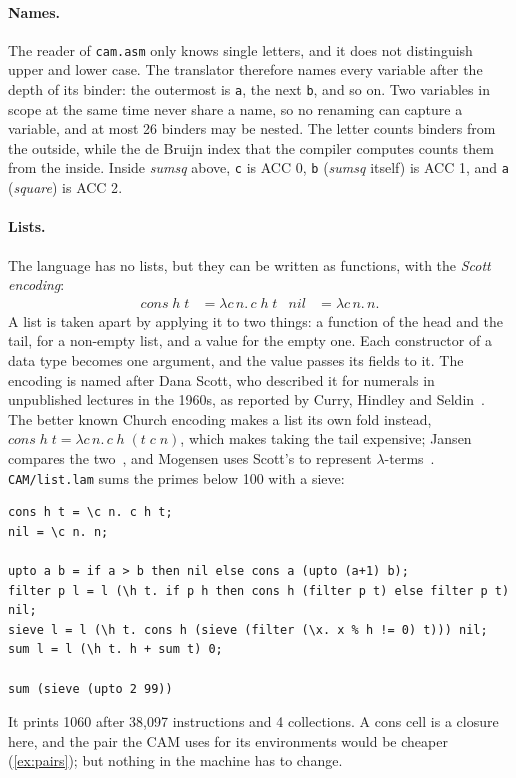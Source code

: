 \documentclass[11pt,a4paper]{article}
\newcommand{\ins}[1]{\textsf{#1}}
\theoremstyle{definition}
\theoremstyle{plain}
\begin{document}
\paragraph{Names.} The reader of \texttt{cam.asm} only knows single
letters, and it does not distinguish upper and lower case. The translator
therefore names every variable after the depth of its binder: the outermost
is \texttt{a}, the next \texttt{b}, and so on. Two variables in scope at the
same time never share a name, so no renaming can capture a variable, and at
most 26 binders may be nested. The letter counts binders from the outside,
while the de Bruijn index that the compiler computes counts them from the
inside. Inside \textit{sumsq} above, \texttt{c} is \ins{ACC 0}, \texttt{b}
(\textit{sumsq} itself) is \ins{ACC 1}, and \texttt{a} (\textit{square}) is
\ins{ACC 2}.

\paragraph{Lists.} The language has no lists, but they can be written as
functions, with the \emph{Scott encoding}:
\begin{align*}
  \mathit{cons}\;h\;t &= \lambda c\,n.\,c\;h\;t &
  \mathit{nil} &= \lambda c\,n.\,n.
\end{align*}
A list is taken apart by applying it to two things: a function of the head
and the tail, for a non-empty list, and a value for the empty one. Each
constructor of a data type becomes one argument, and the value passes its
fields to it. The encoding is named after Dana Scott, who described it for
numerals in unpublished lectures in the 1960s, as reported by Curry, Hindley
and Seldin~\cite{chs72}. The better known Church encoding makes a list its
own fold instead, $\mathit{cons}\;h\;t = \lambda c\,n.\,c\;h\;(t\;c\;n)$, which
makes taking the tail expensive; Jansen compares the two~\cite{jansen13},
and Mogensen uses Scott's to represent $\lambda$-terms~\cite{mogensen92}.
\texttt{CAM/list.lam} sums the primes below 100 with a sieve:
\begin{lstlisting}[style=cam, commentstyle={}]
cons h t = \c n. c h t;
nil = \c n. n;

upto a b = if a > b then nil else cons a (upto (a+1) b);
filter p l = l (\h t. if p h then cons h (filter p t) else filter p t) nil;
sieve l = l (\h t. cons h (sieve (filter (\x. x % h != 0) t))) nil;
sum l = l (\h t. h + sum t) 0;

sum (sieve (upto 2 99))
\end{lstlisting}
It prints 1060 after 38,097 instructions and 4 collections. A cons cell is a
closure here, and the pair the CAM uses for its environments would be
cheaper (\cref{ex:pairs}); but nothing in the machine has to change.
\end{document}
